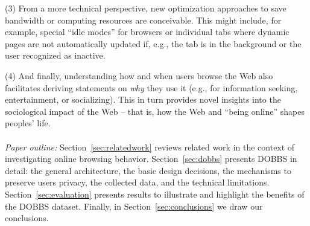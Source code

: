 \documentclass[11pt,fleqn,twoside]{article}
\begin{document}
(3) From a more technical perspective, new optimization approaches to save bandwidth or computing resources are conceivable. This might include, for example, special ``idle modes'' for browsers or individual tabs where dynamic pages are not automatically updated if, e.g., the tab is in the background or the user recognized as inactive.

(4) And finally, understanding how and when users browse the Web also facilitates deriving statements on \textit{why} they use it (e.g., for information seeking, entertainment, or socializing). This in turn provides novel insights into the sociological impact of the Web -- that is, how the Web and ``being online'' shapes peoples' life.
\\
\\
\textit{Paper outline:} Section~\ref{sec:relatedwork} reviews related work in the context of investigating online browsing behavior. Section~\ref{sec:dobbs} presents DOBBS in detail: the general architecture, the basic design decisions, the mechanisms to preserve users privacy, the collected data, and the technical limitations. Section~\ref{sec:evaluation} presents results to illustrate and highlight the benefits of the DOBBS dataset. Finally, in Section~\ref{sec:conclusions} we draw our conclusions.
\end{document}
